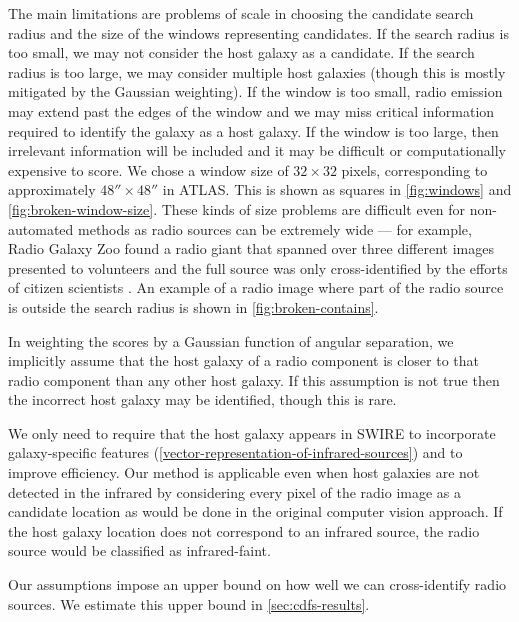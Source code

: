 \documentclass[fleqn,usenatbib,usedcolumn]{mnras}
\newcommand{\edited}[1]{#1}
\begin{document}
    \edited{The main limitations are problems of scale in choosing the
    candidate search radius and the size of the windows
    representing candidates. If the search radius is too small, we may not
    consider the host galaxy as a candidate. If the search radius is too
    large, we may consider multiple host galaxies (though this is mostly
    mitigated by the Gaussian weighting). If the window is too small, radio
    emission may extend past the edges of the window and we may miss critical
    information required to identify the galaxy as a host galaxy. If the
    window is too large, then irrelevant information will be included and it
    may be difficult or computationally expensive to score. We chose a
    window size of $32 \times 32$ pixels, corresponding to approximately $48'' \times 48''$ in
    ATLAS. This is shown as squares in \autoref{fig:windows} and
    \autoref{fig:broken-window-size}. These kinds of size problems are
    difficult even for non-automated methods as radio sources can be extremely
    wide --- for example, Radio Galaxy Zoo found a radio giant that spanned
    over three different images presented to volunteers and the full source
    was only cross-identified by the efforts of citizen scientists
    \citep{banfield15}. An example of a radio image where part of the radio
    source is outside the search radius is shown in
    \autoref{fig:broken-contains}.}

    In weighting the scores by a Gaussian function of angular
    separation, we implicitly assume that the host galaxy of a radio component
    is closer to that radio component than any other host galaxy. If this
    assumption is not true then the incorrect host galaxy may be identified, though
    this is rare.

    We only need to require that the host galaxy appears in SWIRE to
    incorporate galaxy-specific features
    (\autoref{vector-representation-of-infrared-sources}) and to improve
    efficiency. Our method is applicable even when host galaxies are not detected in
    the infrared by considering every pixel of the radio image as a candidate
    location as would be done in the original computer vision approach. \edited{If the host galaxy location does not correspond to an infrared source, the radio source would be classified as infrared-faint.}

    Our assumptions impose an upper bound on how well we can cross-identify
    radio sources. We estimate this upper bound in \autoref{sec:cdfs-results}.
\end{document}
